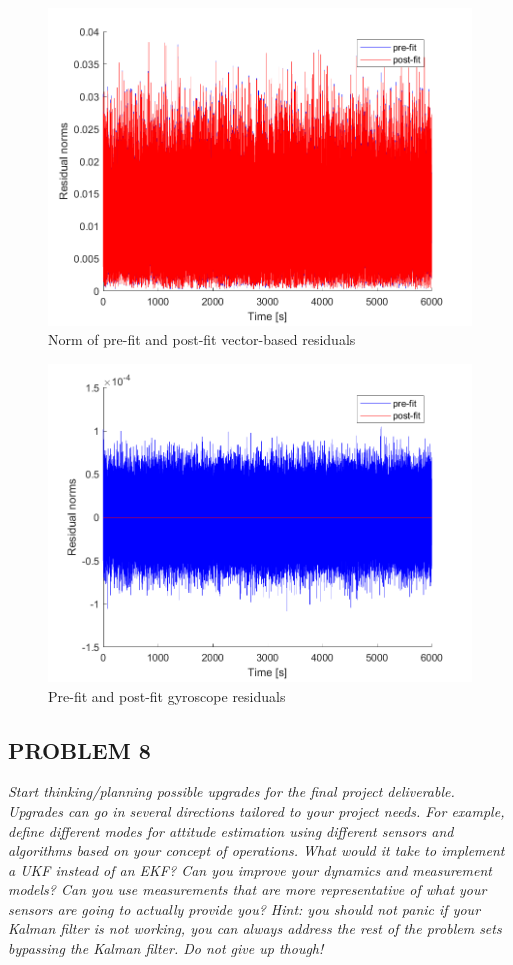 \begin{figure}[H]
\centering
\includegraphics[scale=0.8]{Images/ps8_problem7_res_units.png}
\caption{Norm of pre-fit and post-fit vector-based residuals}
\label{fig:ps8_problem7_res_units}
\end{figure}

\begin{figure}[H]
\centering
\includegraphics[scale=0.6]{Images/ps8_problem7_res_gyro.png}
\caption{Pre-fit and post-fit gyroscope residuals}
\label{fig:ps8_problem7_res_gyro}
\end{figure}

\subsection{PROBLEM 8}
\textit{Start thinking/planning possible upgrades for the final project deliverable. Upgrades can go in several directions tailored to your project needs. For example, define different modes for attitude estimation using different sensors and algorithms based on your concept of operations. What would it take to implement a UKF instead of an EKF? Can you improve your dynamics and measurement models? Can you use measurements that are more representative of what your sensors are going to actually provide you? Hint: you should not panic if your Kalman filter is not working, you can always address the rest of the problem sets bypassing the Kalman filter. Do not give up though!}

